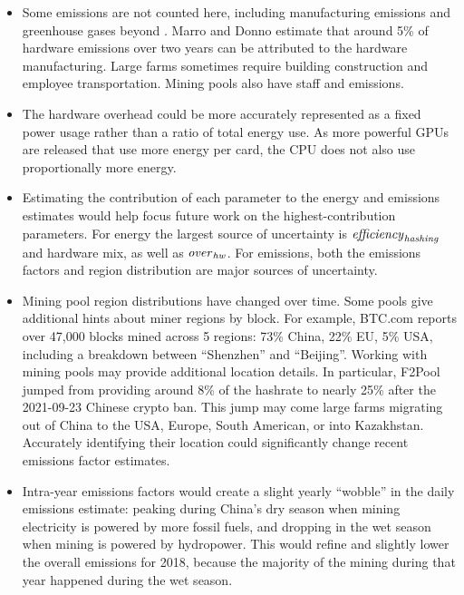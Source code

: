 \begin{itemize}
    
    \item Some emissions are not counted here, including manufacturing emissions and greenhouse gases beyond \COtwo{}. Marro and Donno estimate that around 5\% of hardware emissions over two years can be attributed to the hardware manufacturing. Large farms sometimes require building construction and employee transportation. Mining pools also have staff and emissions.
    
    \item The hardware overhead could be more accurately represented as a fixed power usage rather than a ratio of total energy use. As more powerful GPUs are released that use more energy per card, the CPU does not also use proportionally more energy.
    
    \item Estimating the contribution of each parameter to the energy and emissions estimates would help focus future work on the highest-contribution parameters. For energy the largest source of uncertainty is $\mathit{efficiency}_\mathit{hashing}$ and hardware mix, as well as $\mathit{over}_\mathit{hw}$. For emissions, both the emissions factors and region distribution are major sources of uncertainty.
    
    \item Mining pool region distributions have changed over time. Some pools give additional hints about miner regions by block. For example, BTC.com reports\cite{btccom_btccom_2021} over 47,000 blocks mined across 5 regions: 73\% China, 22\% EU, 5\% USA, including a breakdown between ``Shenzhen'' and ``Beijing''. Working with mining pools may provide additional location details. In particular, F2Pool jumped from providing around 8\% of the hashrate to nearly 25\% after the 2021-09-23 Chinese crypto ban\cite{gkritsi_china_2021}. This jump may come large farms migrating out of China\cite{ibc_group_ibc_2021} to the USA, Europe, South American, or into Kazakhstan. Accurately identifying their location could significantly change recent emissions factor estimates.
    
    \item Intra-year emissions factors would create a slight yearly ``wobble'' in the daily emissions estimate: peaking during China's dry season when mining electricity is powered by more fossil fuels, and dropping in the wet season when mining is powered by hydropower. This would refine and slightly lower the overall emissions for 2018, because the majority of the mining during that year happened during the wet season.
    

\end{itemize}
